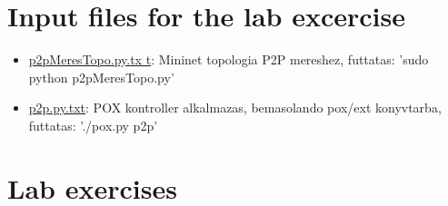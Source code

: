 \documentclass[a4paper]{article}
\begin{document}
\section{Input files for the lab excercise}
\begin{itemize}

    \item

          \href{https://qosip.tmit.bme.hu/foswiki/pub/Meres/P2PAlkalmazasokMeresiSegedlet/p2pMeresTopo.py.txt}{p2pMeresTopo.py.tx
              t}: Mininet topologia P2P mereshez, futtatas: 'sudo python p2pMeresTopo.py'

    \item

          \href{https://qosip.tmit.bme.hu/foswiki/pub/Meres/P2PAlkalmazasokMeresiSegedlet/p2pMeresTopo.py.txt}{p2p.py.txt}: POX
          kontroller alkalmazas, bemasolando pox/ext konyvtarba, futtatas: './pox.py p2p'
\end{itemize}

\section{Lab exercises}
\end{document}
